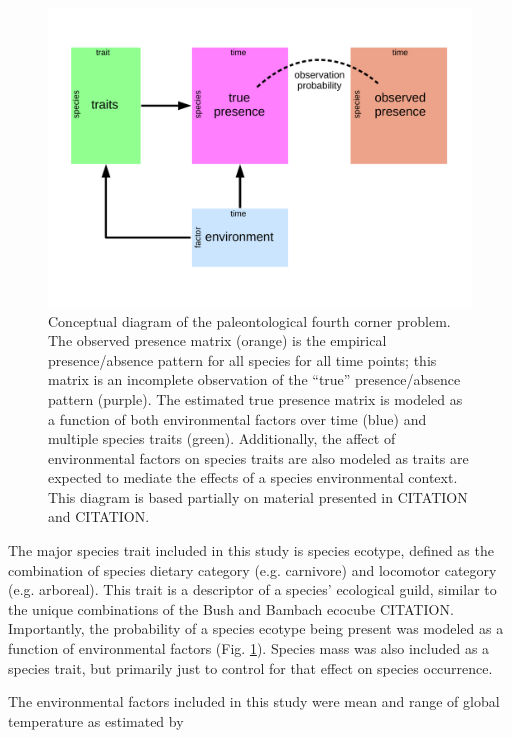 \documentclass[12pt,letterpaper]{article}
\begin{document}
\begin{figure}[ht]
  \centering
  \includegraphics[width=\textwidth,height=0.8\textheight,keepaspectratio=true]{figure/paleo_fourth_corner}
  \caption[Conceptual diagram of the paleontological fourth-courner problem]{Conceptual diagram of the paleontological fourth corner problem. The observed presence matrix (orange) is the empirical presence/absence pattern for all species for all time points; this matrix is an incomplete observation of the ``true'' presence/absence pattern (purple). The estimated true presence matrix is modeled as a function of both environmental factors over time (blue) and multiple species traits (green). Additionally, the affect of environmental factors on species traits are also modeled as traits are expected to mediate the effects of a species environmental context. This diagram is based partially on material presented in CITATION and CITATION.}
  \label{fig:concept_fourth_corner}
\end{figure}


The major species trait included in this study is species ecotype, defined as the combination of species dietary category (e.g. carnivore) and locomotor category (e.g. arboreal). This trait is a descriptor of a species' ecological guild, similar to the unique combinations of the Bush and Bambach ecocube CITATION. Importantly, the probability of a species ecotype being present was modeled as a function of environmental factors (Fig. \ref{fig:concept_fourth_corner}). Species mass was also included as a species trait, but primarily just to control for that effect on species occurrence. 

The environmental factors included in this study were mean and range of global temperature as estimated by 
\end{document}
